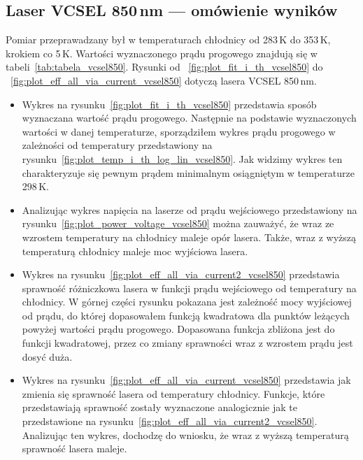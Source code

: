 \newpage
\subsection{Laser VCSEL 850\,nm --- omówienie wyników}
Pomiar przeprawadzany był w temperaturach chłodnicy od 283\,K do 353\,K, krokiem co 5\,K. Wartości wyznaczonego prądu progowego
znajdują się w tabeli~\ref{tab:tabela_vcsel850}. Rysunki od ~\ref{fig:plot_fit_i_th_vcsel850} do ~\ref{fig:plot_eff_all_via_current_vcsel850} dotyczą lasera
VCSEL 850\,nm.
\begin{itemize}
\item Wykres na rysunku~\ref{fig:plot_fit_i_th_vcsel850} przedstawia sposób wyznaczana wartość prądu progowego. Następnie na podstawie
wyznaczonych wartości w danej temperaturze, sporządziłem wykres prądu progowego w zależności od temperatury
przedstawiony na rysunku~\ref{fig:plot_temp_i_th_log_lin_vcsel850}. Jak widzimy wykres ten charakteryzuje się pewnym prądem
minimalnym osiągniętym w temperaturze 298\,K.
\item Analizując wykres napięcia na laserze od prądu wejściowego przedstawiony na rysunku~\ref{fig:plot_power_voltage_vcsel850}
można zauważyć, że wraz ze wzrostem temperatury na chłodnicy
maleje opór lasera. Także, wraz z wyższą temperaturą chłodnicy maleje moc wyjściowa lasera.
\item Wykres na rysunku~\ref{fig:plot_eff_all_via_current2_vcsel850} przedstawia sprawność różniczkowa lasera w funkcji prądu wejściowego
od temperatury na chłodnicy. W górnej części rysunku pokazana jest zależność mocy wyjściowej od prądu, do której dopasowałem
funkcją kwadratowa dla punktów leżących powyżej wartości prądu progowego. Dopasowana funkcja zbliżona jest do funkcji kwadratowej,
przez co zmiany sprawności wraz z wzrostem prądu jest dosyć duża.
\item Wykres na rysunku~\ref{fig:plot_eff_all_via_current_vcsel850} przedstawia jak zmienia się sprawność lasera od temperatury chłodnicy.
Funkcje, które przedstawiają sprawność zostały wyznaczone analogicznie jak te przedstawione na rysunku~\ref{fig:plot_eff_all_via_current2_vcsel850}.
Analizując ten wykres, dochodzę do wniosku, że wraz z wyższą temperaturą sprawność lasera maleje.
\end{itemize}
